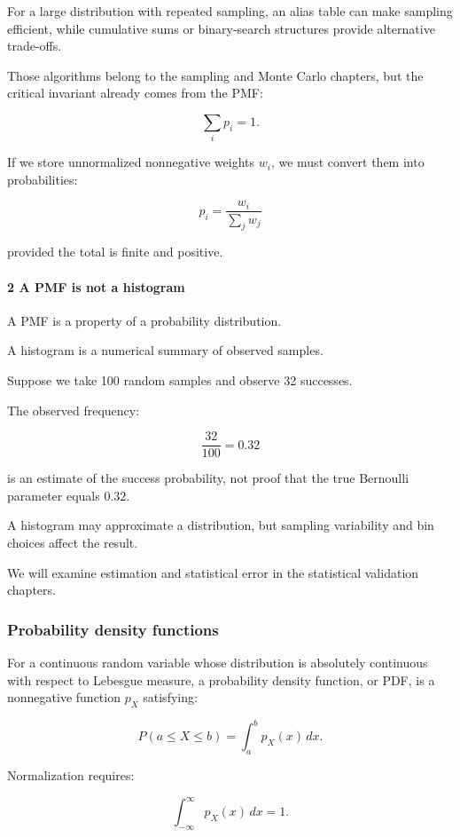 For a large distribution with repeated sampling, an alias table can make sampling efficient, while cumulative sums or binary-search structures provide alternative trade-offs.

Those algorithms belong to the sampling and Monte Carlo chapters, but the critical invariant already comes from the PMF:

\[
 \sum_ip_i=1.
\]

If we store unnormalized nonnegative weights \(w_i\), we must convert them into probabilities:

\[
 \boxed{ p_i=\frac{w_i}{\sum_jw_j} }
\]

provided the total is finite and positive.

\paragraph{2 A PMF is not a histogram}\label{a-pmf-is-not-a-histogram}

A PMF is a property of a probability distribution.

A histogram is a numerical summary of observed samples.

Suppose we take 100 random samples and observe 32 successes.

The observed frequency:

\[
 \frac{32}{100}=0.32
\]

is an estimate of the success probability, not proof that the true Bernoulli parameter equals \(0.32\).

A histogram may approximate a distribution, but sampling variability and bin choices affect the result.

We will examine estimation and statistical error in the statistical validation chapters.

\subsubsection{Probability density functions}\label{probability-density-functions}

For a continuous random variable whose distribution is absolutely continuous with respect to Lebesgue measure, a probability density function, or PDF, is a nonnegative function \(p_X\) satisfying:

\[
 \boxed{ P(a\le X\le b) = \int_a^bp_X(x)\,dx }.
\]

Normalization requires:

\[
 \boxed{ \int_{-\infty}^{\infty}p_X(x)\,dx=1 }.
\]

